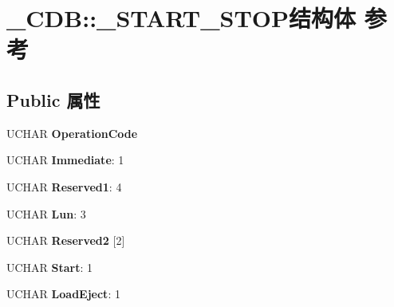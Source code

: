 \hypertarget{struct___c_d_b_1_1___s_t_a_r_t___s_t_o_p}{}\section{\+\_\+\+C\+DB\+:\+:\+\_\+\+S\+T\+A\+R\+T\+\_\+\+S\+T\+O\+P结构体 参考}
\label{struct___c_d_b_1_1___s_t_a_r_t___s_t_o_p}
\subsection*{Public 属性}
\begin{DoxyCompactItemize}
\item 
\mbox{\label{struct___c_d_b_1_1___s_t_a_r_t___s_t_o_p_a040eaadb303ee735302f05c849d12d76}} 
U\+C\+H\+AR {\bfseries Operation\+Code}
\item 
\mbox{\label{struct___c_d_b_1_1___s_t_a_r_t___s_t_o_p_ae17865406638b07eb4af53fa813b6669}} 
U\+C\+H\+AR {\bfseries Immediate}\+: 1
\item 
\mbox{\label{struct___c_d_b_1_1___s_t_a_r_t___s_t_o_p_a4093664e85de452d441a3e4bd5e254c1}} 
U\+C\+H\+AR {\bfseries Reserved1}\+: 4
\item 
\mbox{\label{struct___c_d_b_1_1___s_t_a_r_t___s_t_o_p_a9bc781e7535784c996720930e54503e0}} 
U\+C\+H\+AR {\bfseries Lun}\+: 3
\item 
\mbox{\label{struct___c_d_b_1_1___s_t_a_r_t___s_t_o_p_ad37da97b2cc4b84f0cd97710b7a11479}} 
U\+C\+H\+AR {\bfseries Reserved2} \mbox{[}2\mbox{]}
\item 
\mbox{\label{struct___c_d_b_1_1___s_t_a_r_t___s_t_o_p_a0d2e60d625afc723c7f8e6eb0d32dc37}} 
U\+C\+H\+AR {\bfseries Start}\+: 1
\item 
\mbox{\label{struct___c_d_b_1_1___s_t_a_r_t___s_t_o_p_a73993df6e08e60d4da950aa30346e92f}} 
U\+C\+H\+AR {\bfseries Load\+Eject}\+: 1
\item 

\end{DoxyCompactItemize}

